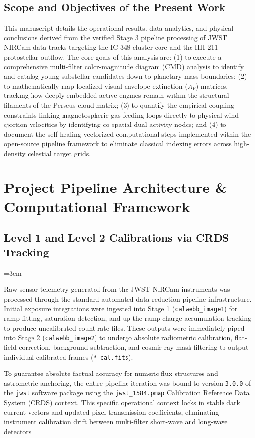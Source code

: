 \documentclass[twocolumn]{aastex63}
\begin{document}
\subsection{Scope and Objectives of the Present Work}
This manuscript details the operational results, data analytics, and physical conclusions derived from the verified Stage 3 pipeline processing of JWST NIRCam data tracks targeting the IC 348 cluster core and the HH 211 protostellar outflow. The core goals of this analysis are: (1) to execute a comprehensive multi-filter color-magnitude diagram (CMD) analysis to identify and catalog young substellar candidates down to planetary mass boundaries; (2) to mathematically map localized visual envelope extinction ($A_V$) matrices, tracking how deeply embedded active engines remain within the structural filaments of the Perseus cloud matrix; (3) to quantify the empirical coupling constraints linking magnetospheric gas feeding loops directly to physical wind ejection velocities by identifying co-spatial dual-activity nodes; and (4) to document the self-healing vectorized computational steps implemented within the open-source pipeline framework to eliminate classical indexing errors across high-density celestial target grids.

\section{Project Pipeline Architecture \& Computational Framework}
\label{sec:pipeline}

\subsection{Level 1 and Level 2 Calibrations via CRDS Tracking}
{
\emergencystretch=3em          %
\sloppy                        %

Raw sensor telemetry generated from the JWST NIRCam instruments was processed through the standard automated data reduction pipeline infrastructure. Initial exposure integrations were ingested into Stage 1 (\texttt{calwebb\_image1}) for ramp fitting, saturation detection, and up-the-ramp charge accumulation tracking to produce uncalibrated count-rate files. These outputs were immediately piped into Stage 2 (\texttt{calwebb\_image2}) to undergo absolute radiometric calibration, flat-field correction, background subtraction, and cosmic-ray mask filtering to output individual calibrated frames (\texttt{*\_cal.fits}).

To guarantee absolute factual accuracy for numeric flux structures and astrometric anchoring, the entire pipeline iteration was bound to version \texttt{3.0.0} of the \texttt{jwst} software package using the \texttt{jwst\_1584.pmap} Calibration Reference Data System (CRDS) context. This specific operational context locks in stable dark current vectors and updated pixel transmission coefficients, eliminating instrument calibration drift between multi-filter short-wave and long-wave detectors.
}
\end{document}
